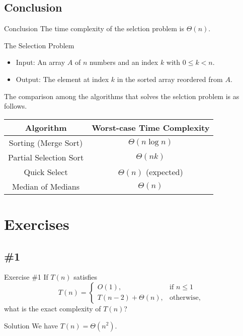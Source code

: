 \documentclass{beamer}
\begin{document}
\subsection{Conclusion}
\begin{frame}{Conclusion}
  The time complexity of the selction problem is $\Theta(n)$.
  \begin{block}{The Selection Problem}
    \begin{itemize}
      \item Input: An array $A$ of $n$ numbers and an index $k$ with
      $0 \leq k < n$.
      \item Output: The element at index $k$ in the sorted array reordered
      from $A$. \pause
    \end{itemize}
  \end{block}
  The comparison among the algorithms that solves the selction problem is as
  follows.
  \begin{center}
    \def\arraystretch{1.5}
    \begin{tabular}{|c|c|}
      \hline
      Algorithm & Worst-case Time Complexity \\
      \hline
      Sorting (Merge Sort) & $\Theta(n \log n)$ \\
      Partial Selection Sort & $\Theta(nk)$ \\
      Quick Select & $\Theta(n)$ (expected) \\
      Median of Medians & $\Theta(n)$ \\
      \hline
    \end{tabular}
  \end{center}
\end{frame}

\section{Exercises}
\subsection{\#1}
\begin{frame}{Exercise \#1}
  If $T(n)$ satisfies
  \begin{equation*}
    T(n) =
    \begin{cases}
      O(1), &\text{if $n \leq 1$} \\
      T(n - 2) + \Theta(n), &\text{otherwise},
    \end{cases}
  \end{equation*}
  what is the exact complexity of $T(n)$? \pause
  \begin{block}{Solution}
    We have $T(n) = \Theta(n^2)$.
  \end{block}
\end{frame}
\end{document}
